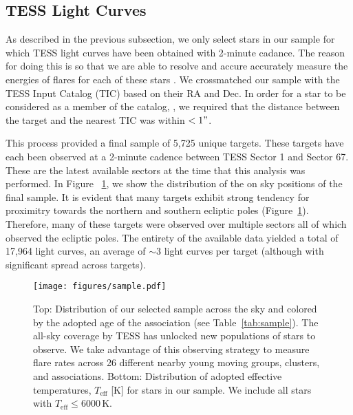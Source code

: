 \documentclass[twocolumn]{aastex631}
\begin{document}
\subsection{TESS Light Curves}\label{subsec2:TESS_lightcurve}

As described in the previous subsection, we only select stars in our sample for which TESS light curves have been obtained with 2-minute cadance. The reason for doing this is so that we are able to resolve and accure accurately measure the energies of flares for each of these stars \citep{howard22}.
We crossmatched our sample with the TESS Input Catalog (TIC) based on their RA and Dec.
In order for a star to be considered as a member of the catalog, , we required that  the distance between the target and
the nearest TIC was within $<1"$.


This process provided  a final sample of 5,725 unique targets. These targets have each been observed at a 2-minute cadence between TESS Sector 1 and Sector 67. These are the latest available sectors at the time that this analysis was performed. In Figure ~\ref{fig:sample}, we show the distribution of the on sky positions of the final sample.  It is evident that  many targets exhibit strong tendency for proximitry towards the
northern and southern ecliptic poles (Figure~\ref{fig:sample}). Therefore, many  of these targets were observed
over multiple sectors all of which observed the ecliptic poles. The entirety of the available data yielded  a total of 17,964
light curves, an average of $\sim 3$ light curves per target (although with significant spread across targets).

\begin{figure}[ht!]
    \begin{centering}
        \texttt{[image: figures/sample.pdf]}
        \caption{
            Top: Distribution of our selected sample across the sky and colored by the adopted age of the association (see Table~\ref{tab:sample}). The all-sky coverage by TESS has unlocked new populations of stars to observe. We take advantage of this observing strategy to measure flare rates across 26 different nearby young moving groups, clusters, and associations. Bottom: Distribution of adopted effective temperatures, $T_\textrm{eff}$ [K] for stars in our sample. We include all stars with $T_\textrm{eff} \leq 6000$\,K.
        }
        \label{fig:sample}
    \end{centering}
\end{figure}
\end{document}
